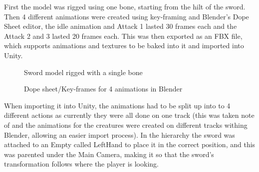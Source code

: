 \documentclass[11pt]{report}
\begin{document}
First the model was rigged using one bone, starting from the hilt of the sword. Then 4 different animations were created using key-framing and Blender's Dope Sheet editor, the idle animation and Attack 1 lasted 30 frames each and the Attack 2 and 3 lasted 20 frames each. This was then exported as an FBX file, which supports animations and textures to be baked into it and imported into Unity.
\begin{figure}[H]
    \begin{minipage}{.2\textwidth}
        \centering
        \caption{Sword model rigged with a single bone}
    \end{minipage}
    \begin{minipage}{.8\textwidth}
        \centering
        \caption{Dope sheet/Key-frames for 4 animations in Blender}
    \end{minipage}
\end{figure}

When importing it into Unity, the animations had to be split up into to 4 different actions as currently they were all done on one track (this was taken note of and the animations for the creatures were created on different tracks withing Blender, allowing an easier import process). In the hierarchy the sword was attached to an Empty called LeftHand to place it in the correct position, and this was parented under the Main Camera, making it so that the sword's transformation follows where the player is looking.
\end{document}
